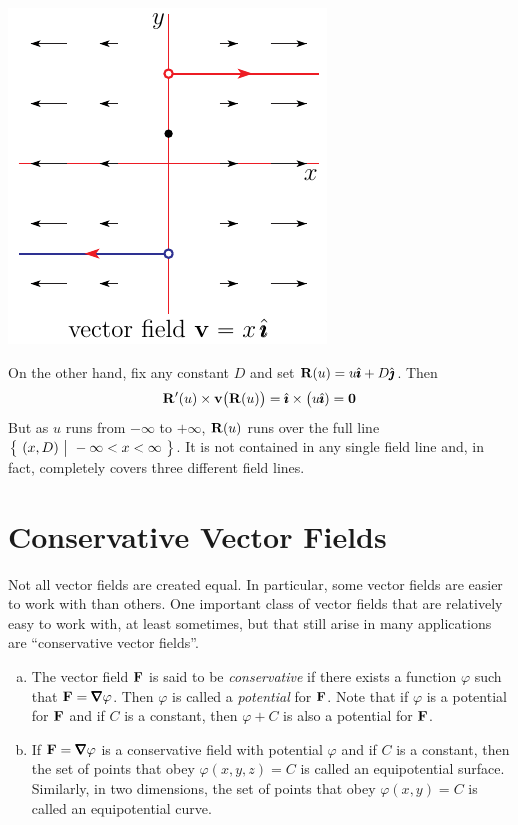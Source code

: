 \begin{eg}
\begin{nfig}
\begin{center}
   \includegraphics{horizontalField}
\end{center}
\end{nfig}
On the other hand, fix any constant $D$ and set $\mathbf{R}(u) = u\hat{\pmb{\imath}} +D\hat{\pmb{\jmath}}$.
Then
\begin{equation*}
\mathbf{R}'(u)\times\mathbf{v}\big(\mathbf{R}(u)\big)
=\hat{\pmb{\imath}}\times\big(u\hat{\pmb{\imath}})
=\mathbf{0}
\end{equation*}
But as $u$ runs from $-\infty$ to $+\infty$, $\mathbf{R}(u)$ runs over the 
full line $\big\{ \ (x,D)\ \big|\ -\infty<x<\infty\ \big\}$. It is not contained in any
single field line and, in fact, completely covers three
different field lines. 


\end{eg}

\section{Conservative Vector Fields}\label{sec:conservativeFields}

Not all vector fields are created equal. In particular, some vector
fields are easier to work with than others. One important class 
of vector fields that are relatively easy to work with, at least sometimes, 
but that still arise in many applications are ``conservative vector fields''. 

\begin{defn}\label{def:conservative}

\begin{enumerate}[(a)]
\item
The vector field $\mathbf{F}$ is said to be \emph{conservative} if there
exists a function $\varphi$ such that $\vF = \vnabla\varphi$. Then
$\varphi$ is called a \emph{potential} for $\mathbf{F}$. Note that if $\varphi$ 
is a potential for $\mathbf{F}$ and if $C$ is a constant, then $\varphi+C$
is also a potential for $\mathbf{F}$.

\item If $\vF=\vnabla\varphi$ is a conservative field with potential 
$\varphi$ and if $C$ is a constant, then the set of points that
obey $\varphi(x,y,z)=C$ is called an equipotential surface.
Similarly, in two dimensions, the set of points that
obey $\varphi(x,y)=C$ is called an equipotential curve.
\end{enumerate}
\end{defn}

